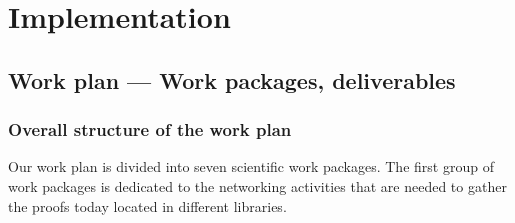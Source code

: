 \chapter{Implementation}\label{chap:implementation}

\section{Work plan --- Work packages, deliverables}

\subsection{Overall structure of the work plan}

Our work plan is divided into seven scientific work packages.
The first group of work packages is dedicated to the networking
activities that are needed to gather the proofs today located in
different libraries.


